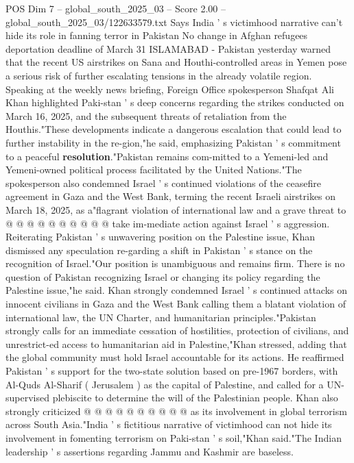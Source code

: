\begin{textsample}{POS Dim 7 – global\_south\_2025\_03 – Score 2.00 – global\_south\_2025\_03/122633579.txt}  \label{ex:f7_pos_094}
Says India ' s victimhood narrative can't hide its role in fanning terror in Pakistan No change in Afghan refugees deportation deadline of March 31 ISLAMABAD - Pakistan yesterday warned that the recent US airstrikes on Sana and Houthi-controlled areas in Yemen pose a serious risk of further escalating tensions in the already volatile region.
Speaking at the weekly news briefing, Foreign Office spokesperson Shafqat Ali Khan highlighted Paki-stan ' s deep concerns regarding the strikes conducted on March 16, 2025, and the subsequent threats of retaliation from the Houthis."These developments indicate a dangerous escalation that could lead to further instability in the re-gion,"he said, emphasizing Pakistan ' s commitment to a peaceful \textbf{resolution}."Pakistan remains com-mitted to a Yemeni-led and Yemeni-owned political process facilitated by the United Nations."The spokesperson also condemned Israel ' s continued violations of the ceasefire agreement in Gaza and the West Bank, terming the recent Israeli airstrikes on March 18, 2025, as a"flagrant violation of international law and a grave threat to @ @ @ @ @ @ @ @ @ @ take im-mediate action against Israel ' s aggression.
Reiterating Pakistan ' s unwavering position on the Palestine issue, Khan dismissed any speculation re-garding a shift in Pakistan ' s stance on the recognition of Israel."Our position is unambiguous and remains firm.
There is no question of Pakistan recognizing Israel or changing its policy regarding the Palestine issue,"he said.
Khan strongly condemned Israel ' s continued attacks on innocent civilians in Gaza and the West Bank calling them a blatant violation of international law, the UN Charter, and humanitarian principles."Pakistan strongly calls for an immediate cessation of hostilities, protection of civilians, and unrestrict-ed access to humanitarian aid in Palestine,"Khan stressed, adding that the global community must hold Israel accountable for its actions.
He reaffirmed Pakistan ' s support for the two-state solution based on pre-1967 borders, with Al-Quds Al-Sharif ( Jerusalem ) as the capital of Palestine, and called for a UN-supervised plebiscite to determine the will of the Palestinian people.
Khan also strongly criticized @ @ @ @ @ @ @ @ @ @ as its involvement in global terrorism across South Asia."India ' s fictitious narrative of victimhood can not hide its involvement in fomenting terrorism on Paki-stan ' s soil,"Khan said."The Indian leadership ' s assertions regarding Jammu and Kashmir are baseless.

\end{textsample}
